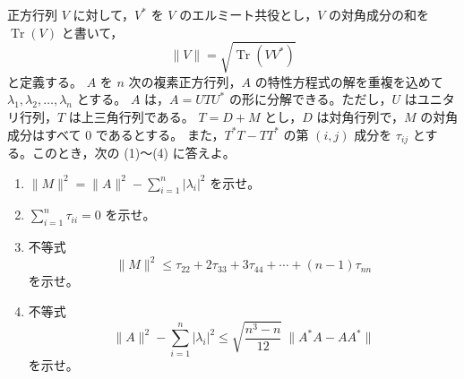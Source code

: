 \documentclass[12pt]{jlreq}
\newcommand{\Tr}{\operatorname{Tr}}
\begin{document}
正方行列 \(V\) に対して，\(V^*\) を \(V\) のエルミート共役とし，\(V\) の対角成分の和を
\(\Tr(V)\) と書いて，
\[
  \|V\|=\sqrt{\Tr(VV^*)}
\]
と定義する。
\(A\) を \(n\) 次の複素正方行列，\(A\) の特性方程式の解を重複を込めて
\(\lambda_1,\lambda_2,\ldots,\lambda_n\) とする。
\(A\) は，\(A=UTU^*\) の形に分解できる。ただし，\(U\) はユニタリ行列，\(T\) は上三角行列である。
\(T=D+M\) とし，\(D\) は対角行列で，\(M\) の対角成分はすべて \(0\) であるとする。
また，\(T^*T-TT^*\) の第 \((i,j)\) 成分を \(\tau_{ij}\) とする。このとき，次の (1)〜(4) に答えよ。

\begin{enumerate}
  \item \(\displaystyle \|M\|^2=\|A\|^2-\sum_{i=1}^{n}|\lambda_i|^2\) を示せ。
  \item \(\displaystyle \sum_{i=1}^{n}\tau_{ii}=0\) を示せ。
  \item 不等式
  \[
    \|M\|^2\le \tau_{22}+2\tau_{33}+3\tau_{44}+\cdots+(n-1)\tau_{nn}
  \]
  を示せ。
  \item 不等式
  \[
    \|A\|^2-\sum_{i=1}^{n}|\lambda_i|^2
      \le \sqrt{\frac{n^3-n}{12}}\ \|A^*A-AA^*\|
  \]
  を示せ。
\end{enumerate}
\end{document}
